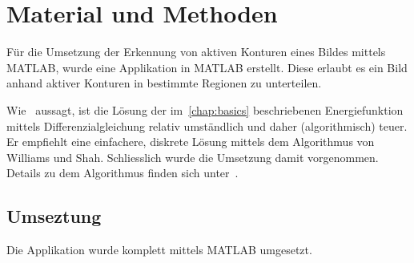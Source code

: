 \chapter{Material und Methoden}
\label{chap:realisation}


% 
% 
Für die Umsetzung der Erkennung von aktiven Konturen eines Bildes mittels MATLAB, wurde eine Applikation in MATLAB erstellt. Diese erlaubt es ein Bild anhand aktiver Konturen in bestimmte Regionen zu unterteilen.

Wie~\citet[S. 147]{hudritsch:script:cp} aussagt, ist die Lösung der im~\autoref{chap:basics} beschriebenen Energiefunktion mittels Differenzialgleichung relativ umständlich und daher (algorithmisch) teuer. Er empfiehlt eine einfachere, diskrete Lösung mittels dem Algorithmus von Williams und Shah. Schliesslich wurde die Umsetzung damit vorgenommen. Details zu dem Algorithmus finden sich unter~\cite[Seite 20]{williams92faa}.

\section{Umseztung}
\label{sec:realization}
Die Applikation wurde komplett mittels MATLAB umgesetzt.

